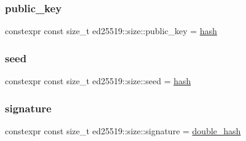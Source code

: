 \mbox{\label{namespaceed25519_1_1size_a8f8f1706b7e101ddc858ad26bdc010eb}} 
\subsubsection{\texorpdfstring{public\+\_\+key}{public\_key}}
{\footnotesize\ttfamily constexpr const size\+\_\+t ed25519\+::size\+::public\+\_\+key = \mbox{\hyperlink{namespaceed25519_1_1size_a0c20525cc9711076ec093177a8e36c25}{hash}}}

\mbox{\label{namespaceed25519_1_1size_a25303466af2d7379e9ceb5955dd70b57}} 
\subsubsection{\texorpdfstring{seed}{seed}}
{\footnotesize\ttfamily constexpr const size\+\_\+t ed25519\+::size\+::seed = \mbox{\hyperlink{namespaceed25519_1_1size_a0c20525cc9711076ec093177a8e36c25}{hash}}}

\mbox{\label{namespaceed25519_1_1size_adefacb85c80ee8d51c482044e6d79a26}} 
\subsubsection{\texorpdfstring{signature}{signature}}
{\footnotesize\ttfamily constexpr const size\+\_\+t ed25519\+::size\+::signature = \mbox{\hyperlink{namespaceed25519_1_1size_ac853f864bb12792f88647a998c3c030f}{double\+\_\+hash}}}

